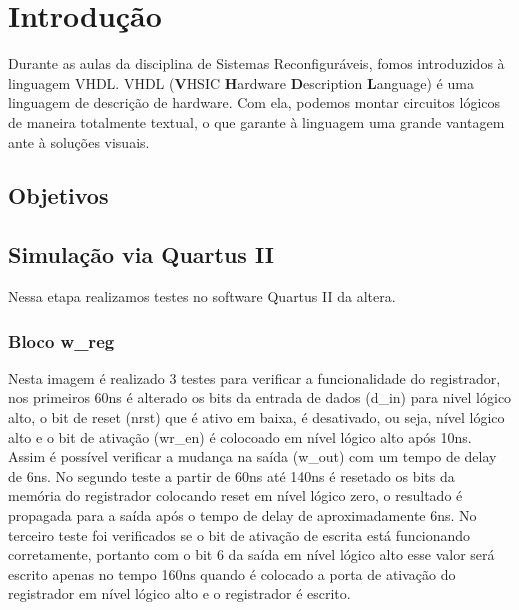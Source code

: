 \documentclass{article}
\begin{document}


\newpage
\thispagestyle{empty}
\tableofcontents

\newpage
\large %

\section{Introdução}

Durante as aulas da disciplina de Sistemas Reconfiguráveis, fomos introduzidos à linguagem VHDL. VHDL (\textbf{V}HSIC \textbf{H}ardware \textbf{D}escription \textbf{L}anguage) é uma linguagem de descrição de hardware. Com ela, podemos montar circuitos lógicos de maneira totalmente textual, o que garante à linguagem uma grande vantagem ante à soluções visuais.

\subsection{Objetivos}

\subsection{Simulação via Quartus II}

Nessa etapa realizamos testes no software Quartus II da altera.

\subsubsection{Bloco w\_reg}

Nesta imagem é realizado 3 testes para verificar a funcionalidade do registrador, nos primeiros 60ns é alterado os bits da entrada de dados (d\_in) para nivel lógico alto, o bit de reset (nrst) que é ativo em baixa, é desativado, ou seja, nível lógico alto e o bit de ativação (wr\_en) é colocoado em nível lógico alto após 10ns. Assim é possível verificar a mudança na saída (w\_out) com um tempo de delay de 6ns. No segundo teste a partir de 60ns até 140ns é resetado os bits da memória do registrador colocando reset em nível lógico zero, o resultado é propagada para a saída após o tempo de delay de aproximadamente 6ns. No terceiro teste foi verificados se o bit de ativação de escrita está funcionando corretamente, portanto com o bit 6 da saída em nível lógico alto esse valor será escrito apenas no tempo 160ns quando é colocado a porta de ativação do registrador em nível lógico alto e o registrador é escrito.
\end{document}
